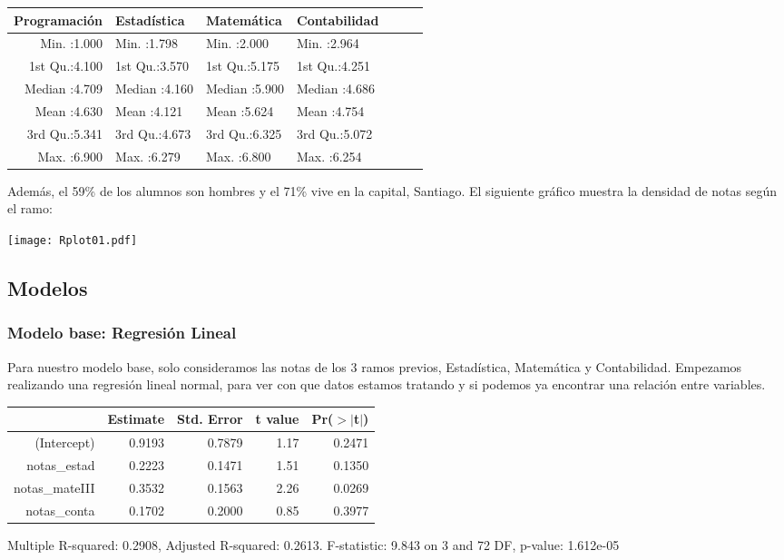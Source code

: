 \documentclass[11pt]{article}
\begin{document}
\begin{table}[ht]
\centering
\begin{tabular}{rllllll}
  \hline
  Programación & Estadística & Matemática & Contabilidad \\ 
  \hline
  Min.   :1.000   & Min.   :1.798   & Min.   :2.000   & Min.   :2.964  \\ 
  1st Qu.:4.100   & 1st Qu.:3.570   & 1st Qu.:5.175   & 1st Qu.:4.251  \\ 
  Median :4.709   & Median :4.160   & Median :5.900   & Median :4.686  \\ 
  Mean   :4.630   & Mean   :4.121   & Mean   :5.624   & Mean   :4.754  \\ 
  3rd Qu.:5.341   & 3rd Qu.:4.673   & 3rd Qu.:6.325   & 3rd Qu.:5.072  \\ 
  Max.   :6.900   & Max.   :6.279   & Max.   :6.800   & Max.   :6.254  \\ 
   \hline
\end{tabular}
\end{table}

Además, el 59\% de los alumnos son hombres y el 71\% vive en la capital, Santiago. 
El siguiente gráfico muestra la densidad de notas según el ramo:

\begin{center}
\texttt{[image: Rplot01.pdf]}

\end{center}

\newpage
\subsection{Modelos}

\subsubsection{Modelo base: Regresión Lineal}

Para nuestro modelo base, solo consideramos las notas de los 3 ramos previos, Estadística, Matemática y Contabilidad.
Empezamos realizando una regresión lineal normal, para ver con que datos estamos tratando y si podemos ya encontrar una relación entre variables.

\begin{center}
\begin{table}[ht]
\begin{center}
\begin{tabular}{rrrrr}
  \hline
 & Estimate & Std. Error & t value & Pr($>$$|$t$|$) \\ 
  \hline
(Intercept) & 0.9193 & 0.7879 & 1.17 & 0.2471 \\ 
  notas\_estad & 0.2223 & 0.1471 & 1.51 & 0.1350 \\ 
  notas\_mateIII & 0.3532 & 0.1563 & 2.26 & 0.0269 \\ 
  notas\_conta & 0.1702 & 0.2000 & 0.85 & 0.3977 \\ 
   \hline
\end{tabular}
\end{center}
\end{table}
\tiny{Multiple R-squared: 0.2908, Adjusted R-squared: 0.2613.
F-statistic: 9.843 on 3 and 72 DF, p-value: 1.612e-05}
\end{center}
\end{document}
